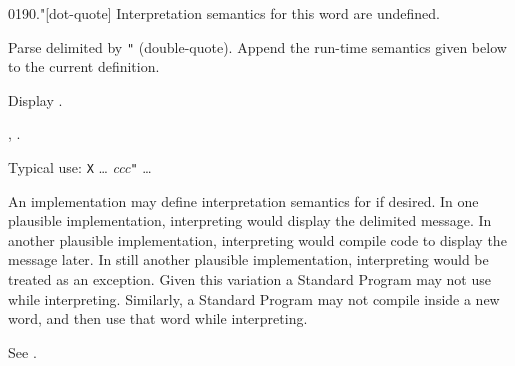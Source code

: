 \begin{worddef}[.q]{0190}{."}[dot-quote]
\interpret
	Interpretation semantics for this word are undefined.

\compile

	Parse  delimited by \texttt{"} (double-quote).
	Append the run-time semantics given below to the current
	definition.

\runtime
	\stack{}{}

	Display .

\see {},
	.

	\begin{defer}
	\rationale %
		Typical use:
			\word{:} \texttt{X} {\ldots}
				 \emph{ccc}\texttt{"} {\ldots}
			\word{;}

		An implementation may define interpretation semantics for
		 if desired. In one plausible implementation,
		interpreting  would display the delimited message.
		In another plausible implementation, interpreting 
		would compile code to display the message later. In still
		another plausible implementation, interpreting  would
		be treated as an exception. Given this variation a Standard
		Program may not use  while interpreting. Similarly,
		a Standard Program may not compile  
		inside a new word, and then use that word while interpreting.

	\testing\rmfamily
		See .
	\end{defer}
\end{worddef}


